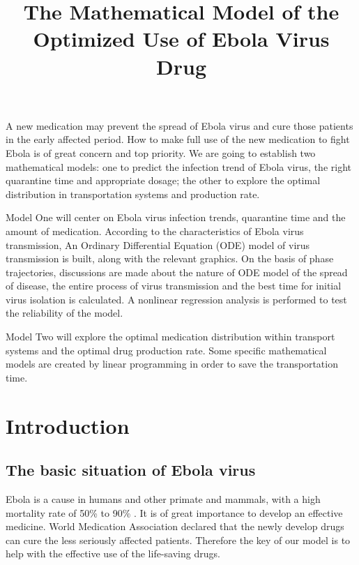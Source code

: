 \documentclass{icmmcm}
\title{The Mathematical Model of the Optimized Use of Ebola Virus Drug}
\begin{document}
\begin{summary}
A new medication may prevent the spread of Ebola virus and cure
 those patients in the early affected period. How to make full
 use of the new medication to fight Ebola is of great concern
 and top priority. We are going to establish two mathematical
 models: one to predict  the infection trend of Ebola virus, the
 right quarantine time and appropriate dosage; the other to
 explore the optimal distribution  in transportation systems and
production rate.
\par Model One will center on Ebola virus infection trends,
 quarantine time and the amount of medication. According to the
 characteristics of Ebola virus transmission, An Ordinary 
 Differential Equation (ODE) model of virus transmission is
 built, along with the relevant graphics. On the basis of phase
 trajectories, discussions are made about the nature of ODE
 model of the spread of disease, the entire process of virus
 transmission and the best time for initial virus isolation is
 calculated. A nonlinear regression analysis is performed to
 test the reliability of the model.
\par Model Two will explore the optimal medication distribution
 within transport systems and the optimal drug production rate.
 Some specific mathematical models are created by linear
 programming in order to save the transportation time.
\end{summary}

\maketitle
\thispagestyle{fancy}


\section{Introduction}
\subsection{The basic situation of Ebola virus}
 Ebola is a cause in humans and other primate and mammals, with
 a high mortality rate of 50\% to 90\% \cite{bib1}. It is of
 great importance to develop an effective medicine. World
 Medication Association declared that the newly develop drugs
 can cure the less seriously affected patients. Therefore the
 key of our model is to help with the effective use of the
 life-saving drugs.
\end{document}
